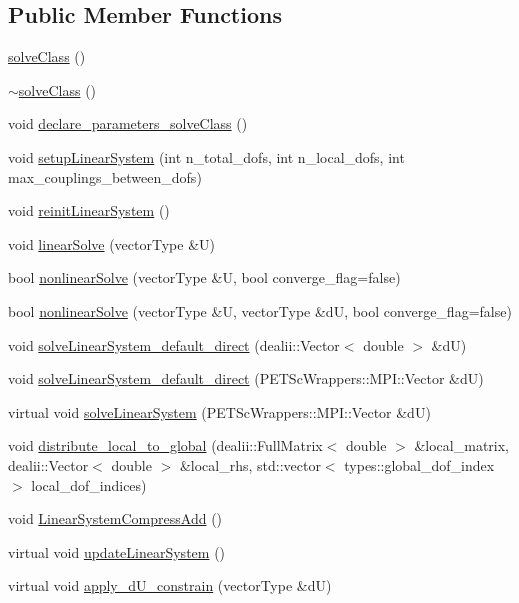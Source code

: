 \subsection*{Public Member Functions}
\begin{DoxyCompactItemize}
\item 
\hyperlink{classsolve_class_ac210b30d39cb640ec4d65b667467583d}{solve\-Class} ()
\item 
\hyperlink{classsolve_class_a827189cdd4bd715d08e4cda1695c8409}{$\sim$solve\-Class} ()
\item 
void \hyperlink{classsolve_class_a5cd5eff72b86e1cf736ddfdcbda31db1}{declare\-\_\-parameters\-\_\-solve\-Class} ()
\item 
void \hyperlink{classsolve_class_abcdd7b865378898804f4831f0a078e04}{setup\-Linear\-System} (int n\-\_\-total\-\_\-dofs, int n\-\_\-local\-\_\-dofs, int max\-\_\-couplings\-\_\-between\-\_\-dofs)
\item 
void \hyperlink{classsolve_class_ab8aad4ce80f4f6fe8532c53e4bba67ec}{reinit\-Linear\-System} ()
\item 
void \hyperlink{classsolve_class_a9e6755b7d81862d2a8412de1eec855a7}{linear\-Solve} (vector\-Type \&U)
\item 
bool \hyperlink{classsolve_class_a9522b1c3074e38e3eeaa060a01709580}{nonlinear\-Solve} (vector\-Type \&U, bool converge\-\_\-flag=false)
\item 
bool \hyperlink{classsolve_class_ae8689a33a3a9ed36b59529c53527c5f9}{nonlinear\-Solve} (vector\-Type \&U, vector\-Type \&d\-U, bool converge\-\_\-flag=false)
\item 
void \hyperlink{classsolve_class_aaed39c6902f1e1de684583e56fb14f66}{solve\-Linear\-System\-\_\-default\-\_\-direct} (dealii\-::\-Vector$<$ double $>$ \&d\-U)
\item 
void \hyperlink{classsolve_class_ac888eaa37061db46d24d90065b733a82}{solve\-Linear\-System\-\_\-default\-\_\-direct} (P\-E\-T\-Sc\-Wrappers\-::\-M\-P\-I\-::\-Vector \&d\-U)
\item 
virtual void \hyperlink{classsolve_class_a31c22340527a596f8d6aeeea60ffe52a}{solve\-Linear\-System} (P\-E\-T\-Sc\-Wrappers\-::\-M\-P\-I\-::\-Vector \&d\-U)
\item 
void \hyperlink{classsolve_class_af9e8a3e1a38280c43f242bbeb7139f00}{distribute\-\_\-local\-\_\-to\-\_\-global} (dealii\-::\-Full\-Matrix$<$ double $>$ \&local\-\_\-matrix, dealii\-::\-Vector$<$ double $>$ \&local\-\_\-rhs, std\-::vector$<$ types\-::global\-\_\-dof\-\_\-index $>$ local\-\_\-dof\-\_\-indices)
\item 
void \hyperlink{classsolve_class_ad7659997bee5e782a6eaa46db001b66a}{Linear\-System\-Compress\-Add} ()
\item 
virtual void \hyperlink{classsolve_class_af78c2c6284234c93872188334fb997d8}{update\-Linear\-System} ()
\item 
virtual void \hyperlink{classsolve_class_a029ece57f667fa697cb29eb482eff31b}{apply\-\_\-d\-U\-\_\-constrain} (vector\-Type \&d\-U)
\end{DoxyCompactItemize}
